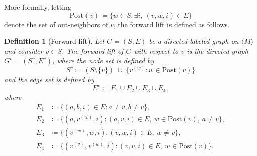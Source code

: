 \documentclass[letterpaper, 10 pt, conference]{ieeeconf}  %
\newcommand{\Mset}{\langle M\rangle}
\newtheorem{definition}{Definition}
\begin{document}
More formally, letting
\[
\mathrm{Post}(v) \coloneqq
\{ w \in S : \exists i,\ (v,w,i)\in E \}
\]
denote the set of out-neighbors of $v$, the forward lift is defined as follows.
\begin{definition}[Forward lift]
Let $G=(S,E)$ be a directed labeled graph on $\Mset$ and consider $v \in S$. The \emph{forward lift} of $G$ with respect to $v$ is the directed graph $G^{v}=(S^{v},E^{v})$, where the node set is defined by
\[
S^{v} \coloneqq (S \setminus \{v\}) \;\cup\; \{ v^{(w)} : w \in \mathrm{Post}(v) \}
\]
and the edge set is defined by
\begin{equation}\label{eq:Ev}
E^{v} \coloneqq E_1 \cup E_2 \cup E_3 \cup E_4,
\end{equation}
where
\begin{align*}
E_1 &\coloneqq \{ (a,b,i) \in E : a\neq v, b\neq v \}, \\
E_2 &\coloneqq \{ (a, v^{(w)}, i) : (a,v,i) \in E, \ w \in \mathrm{Post}(v), \ a \ne v\}, \\
E_3 &\coloneqq \{ (v^{(w)}, w, i) : (v,w,i) \in E, \ w\ne v \}, \\
E_4 &\coloneqq \{ (v^{(v)}, v^{(w)}, i) : (v,v,i) \in E, \ w \in \mathrm{Post}(v) \}.
\end{align*}
\vspace{0.05em}
\end{definition}
\end{document}
